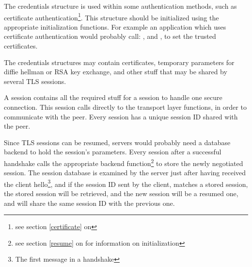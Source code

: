 \par
The credentials structure is used within some authentication methods,
such as certificate authentication\footnote{see section \ref{certificate} on \pageref{certificate}}.
This structure should be initialized using the appropriate initialization
functions. For example an application which uses certificate authentication
would probably call: 
,
and
,
to set the trusted certificates.

\par The credentials structures may contain certificates, temporary parameters for
diffie hellman or RSA key exchange, and other stuff that may be shared
by several TLS sessions.

\par A \gnutls{} session contains all the required stuff for a
session to handle one secure connection. This session calls directly
to the transport layer functions, in order to communicate with the peer.
Every session has a unique session ID shared with the peer.

\par
Since TLS sessions can be resumed, servers would probably need a database
backend to hold the session's parameters. Every \gnutls{} session after
a successful handshake calls the appropriate backend function\footnote{see section \ref{resume}
on \pageref{resume} for information on initialization} to store the
newly negotiated session. The session database is examined by the server
just after having received the client hello\footnote{The first message
in a \tls{} handshake}, and if the session ID sent by the client,
matches a stored session, the stored session will be retrieved, and the
new session will be a resumed one, and will share the same session ID
with the previous one.




